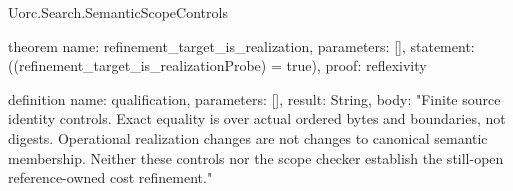 \begin{lexlean}{Uorc.Search.SemanticScopeControls}
\begin{semanticmodule}
theorem{
  name: refinement_target_is_realization,
  parameters: [],
  statement: ((refinement_target_is_realizationProbe) = true),
  proof: reflexivity{}
}

definition{
  name: qualification,
  parameters: [],
  result: String,
  body: "Finite source identity controls. Exact equality is over actual ordered bytes and boundaries, not digests. Operational realization changes are not changes to canonical semantic membership. Neither these controls nor the scope checker establish the still-open reference-owned cost refinement."
}
\end{semanticmodule}
\end{lexlean}
